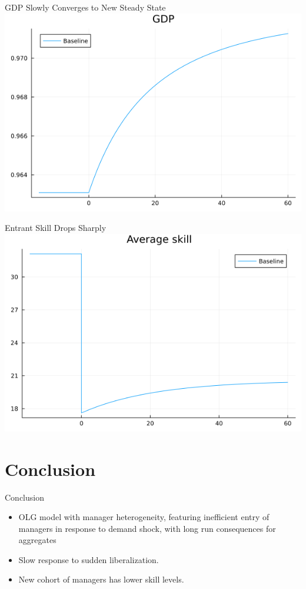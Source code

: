 \documentclass[
  ignorenonframetext,
  aspectratio=1610,
]{beamer}
\providecommand{\tightlist}{%
  \setlength{\itemsep}{0pt}\setlength{\parskip}{0pt}}
\begin{document}
\begin{frame}{GDP Slowly Converges to New Steady State}
\protect\hypertarget{gdp-slowly-converges-to-new-steady-state}{}
\includegraphics{fig/model-gdp-liberalization.png}
\end{frame}

\begin{frame}{Entrant Skill Drops Sharply}
\protect\hypertarget{entrant-skill-drops-sharply}{}
\includegraphics{fig/model-skill-liberalization.png}
\end{frame}

\hypertarget{conclusion}{%
\section{Conclusion}\label{conclusion}}

\begin{frame}{Conclusion}
\protect\hypertarget{conclusion-1}{}
\begin{itemize}
\tightlist
\item
  OLG model with manager heterogeneity, featuring inefficient entry of
  managers in response to demand shock, with long run consequences for
  aggregates
\item
  Slow response to sudden liberalization.
\item
  New cohort of managers has lower skill levels.
\end{itemize}
\end{frame}
\end{document}
